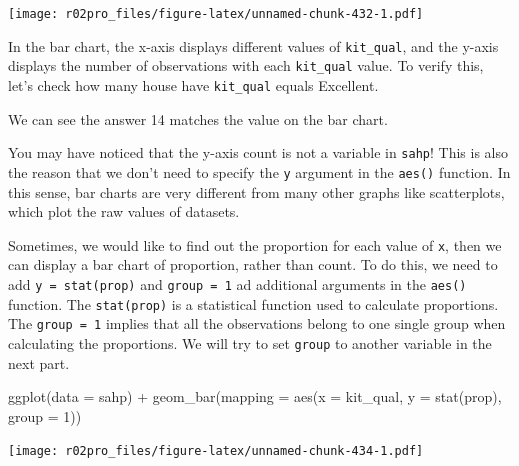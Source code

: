 \documentclass[
]{book}
\newenvironment{Shaded}{\begin{snugshade}}{\end{snugshade}}
\newcommand{\AttributeTok}[1]{\textcolor[rgb]{0.77,0.63,0.00}{#1}}
\newcommand{\CommentTok}[1]{\textcolor[rgb]{0.56,0.35,0.01}{\textit{#1}}}
\newcommand{\DecValTok}[1]{\textcolor[rgb]{0.00,0.00,0.81}{#1}}
\newcommand{\FunctionTok}[1]{\textcolor[rgb]{0.00,0.00,0.00}{#1}}
\newcommand{\NormalTok}[1]{#1}
\newcommand{\SpecialCharTok}[1]{\textcolor[rgb]{0.00,0.00,0.00}{#1}}
\newcommand{\StringTok}[1]{\textcolor[rgb]{0.31,0.60,0.02}{#1}}
\begin{document}
\texttt{[image: r02pro\_files/figure-latex/unnamed-chunk-432-1.pdf]}

In the bar chart, the x-axis displays different values of \texttt{kit\_qual}, and the y-axis displays the number of observations with each \texttt{kit\_qual} value. To verify this, let's check how many house have \texttt{kit\_qual} equals Excellent.

\begin{Shaded}
\end{Shaded}

We can see the answer 14 matches the value on the bar chart.

You may have noticed that the y-axis count is not a variable in \texttt{sahp}! This is also the reason that we don't need to specify the \texttt{y} argument in the \texttt{aes()} function. In this sense, bar charts are very different from many other graphs like scatterplots, which plot the raw values of datasets.

Sometimes, we would like to find out the proportion for each value of \texttt{x}, then we can display a bar chart of proportion, rather than count. To do this, we need to add \texttt{y\ =\ stat(prop)} and \texttt{group\ =\ 1} ad additional arguments in the \texttt{aes()} function. The \texttt{stat(prop)} is a statistical function used to calculate proportions. The \texttt{group\ =\ 1} implies that all the observations belong to one single group when calculating the proportions. We will try to set \texttt{group} to another variable in the next part.

\begin{Shaded}
\begin{Highlighting}[]
\FunctionTok{ggplot}\NormalTok{(}\AttributeTok{data =}\NormalTok{ sahp) }\SpecialCharTok{+} \FunctionTok{geom\_bar}\NormalTok{(}\AttributeTok{mapping =} \FunctionTok{aes}\NormalTok{(}\AttributeTok{x =}\NormalTok{ kit\_qual, }\AttributeTok{y =} \FunctionTok{stat}\NormalTok{(prop), }\AttributeTok{group =} \DecValTok{1}\NormalTok{))}
\end{Highlighting}
\end{Shaded}

\texttt{[image: r02pro\_files/figure-latex/unnamed-chunk-434-1.pdf]}
\end{document}

